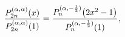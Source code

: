 \[\frac{\mathop{P^{(\alpha,\alpha)}_{2n}\/}\nolimits\!\left(x\right)}{\mathop{P^%
{(\alpha,\alpha)}_{2n}\/}\nolimits\!\left(1\right)}=\frac{\mathop{P^{(\alpha,-%
\frac{1}{2})}_{n}\/}\nolimits\!\left(2x^{2}-1\right)}{\mathop{P^{(\alpha,-%
\frac{1}{2})}_{n}\/}\nolimits\!\left(1\right)},\]